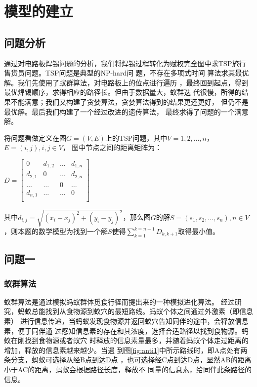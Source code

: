 \documentclass[fontset=windows,a4paper,12pt]{ctexart}
\begin{document}
  \section{模型的建立}
    \subsection{问题分析}
      通过对电路板焊锡问题的分析，我们将焊锡过程转化为赋权完全图中求TSP旅行
      售货员问题。TSP问题是典型的NP-hard问
      题\cite{gutin2006traveling}，不存在多项式时间
      算法求其最优解。我们先使用了蚁群算法，对电路板上的位点进行遍历
      ，最终回到起点，得到最优焊锡顺序，求得相应的路径长。但由于数据量大，蚁群迭
      代很慢，所得的结果不能满意；我们又构建了贪婪算法，贪婪算法得到的结果更还更好，
      但仍不是最优解。最后我们构建了一个经过改进的遗传算法，
      最终求得了问题的一个满意解。
      
      将问题看做定义在图$G=(V,E)$上的TSP问题，其中$V={1,2,\dots,n}$，$E=(i,j),i,j\in V$，
      图中节点之间的距离矩阵为：
      \begin{center}
      	      \begin{math}
      	      D=\left[
      	      \begin{array}{cccc}
      	      0 & d_{1,2} & \dots & d_{1,n}\\
      	      d_{2,1} & 0 & \dots & d_{2,n}\\
      	      \dots & \dots & 0 & \dots \\
      	      d_{n,1} & \dots & \dots & 0 \\
      	      \end{array}
      	      \right]
      	      \end{math}
      \end{center}
	  其中$d_{i,j}=\sqrt{(x_i-x_j)^2+(y_i-y_j)^2}$，那么图$G$的解$S=(s_1,s_2,\dots,s_n),n \in V$，则本题的数学模型为找到一个解$S$使得$\sum_{k=1}^{k=n-1}D_{k,k+1}$取得最小值。
    \subsection{问题一}
	   \subsubsection{蚁群算法}
		   蚁群算法是通过模拟蚂蚁群体觅食行径而提出来的一种模拟进化算法\cite{士勇2004蚁群算法及其应用}。
		   经过研究，蚂蚁总能找到从食物源到蚁穴的最短路线。蚂蚁个体之间通过外激素（即信息素）
		   进行信息传递，当蚂蚁发现食物源并返回蚁穴告知同伴的途中，会释放信息素，便于同伴通
		   过感知信息素的存在和其浓度，选择合适路径以找到食物源。蚂蚁在刚找到食物源或者蚁穴
		   时释放的信息素量最多，并随着蚂蚁个体走过距离的增加，释放的信息素越来越少。当遇
		   到图\ref{fig:anti1}中所示路线时，即A点处有两条分支，蚂蚁可选择从经B点到达D点
		   ，也可选择经C点到达D点，显然AB的距离小于AC的距离，蚂蚁会根据路径长度，释放不
		   同量的信息素，给同伴此条路径的信息\cite{马良2001蚂蚁算法在组合优化中的应用}。
		   
\end{document}
